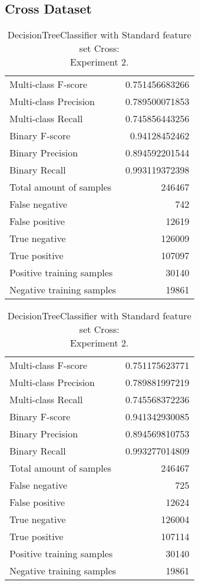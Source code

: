 \newpage
\subsection{Cross Dataset}


\begin{table}[H]
\begin{minipage}{0.5\textwidth}
\caption{DecisionTreeClassifier with Standard feature set Cross: \\Experiment 1.}
\centering
\begin{tabular}{l r}
\toprule
Multi-class F-score & 0.751456683266 \\
Multi-class Precision & 0.789500071853 \\
Multi-class Recall & 0.745856443256 \\
\midrule
Binary F-score & 0.94128452462 \\
Binary Precision & 0.894592201544 \\
Binary Recall & 0.993119372398 \\
\midrule
Total amount of samples & 246467 \\
False negative & 742 \\
False positive & 12619 \\
True negative & 126009 \\
True positive & 107097 \\
\midrule
Positive training samples & 30140 \\
Negative training samples & 19861 \\
\bottomrule
\end{tabular}
\end{minipage}
\hfillx
\begin{minipage}{0.5\textwidth}
\caption{DecisionTreeClassifier with Standard feature set Cross: \\Experiment 2.}
\centering
\begin{tabular}{l r}
\toprule
Multi-class F-score & 0.751175623771 \\
Multi-class Precision & 0.789881997219 \\
Multi-class Recall & 0.745568372236 \\
\midrule
Binary F-score & 0.941342930085 \\
Binary Precision & 0.894569810753 \\
Binary Recall & 0.993277014809 \\
\midrule
Total amount of samples & 246467 \\
False negative & 725 \\
False positive & 12624 \\
True negative & 126004 \\
True positive & 107114 \\
\midrule
Positive training samples & 30140 \\
Negative training samples & 19861 \\
\bottomrule
\end{tabular}
\end{minipage}
\end{table}


